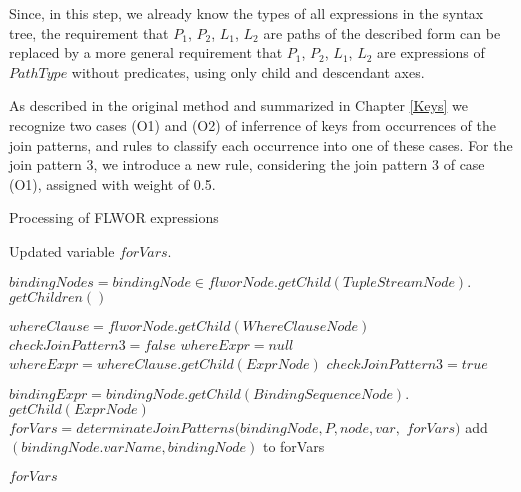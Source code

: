 Since, in this step, we already know the types of all expressions in the syntax tree, the requirement that $P_1$, $P_2$, $L_1$, $L_2$ are paths of the described form can be replaced by a more general requirement that $P_1$, $P_2$, $L_1$, $L_2$ are expressions of $PathType$ without predicates, using only child and descendant axes.

As described in the original method and summarized in Chapter \ref{Keys} we recognize two cases (O1) and (O2) of inferrence of keys from occurrences of the join patterns, and rules to classify each occurrence into one of these cases. For the join pattern 3, we introduce a new rule, considering the join pattern 3 of case (O1), assigned with weight of 0.5. 

\begin{algorithm}
\caption{Processing of FLWOR expressions}
\label{ALG_processing_of_flwor_expressions}
\begin{algorithmic}[1]

\ENSURE Updated variable $forVars$.

\STATE $bindingNodes = bindingNode \in flworNode.getChild(TupleStreamNode).$ $getChildren()$

\STATE $whereClause = flworNode.getChild(WhereClauseNode)$
\STATE $checkJoinPattern3 = false$
\STATE $whereExpr = null$
    \STATE $whereExpr = whereClause.getChild(ExprNode)$
        \STATE $checkJoinPattern3 = true$
    \ENDIF
\ENDIF

    \STATE $bindingExpr = bindingNode.getChild(BindingSequenceNode).$ $getChild(ExprNode)$
            \STATE $forVars = determinateJoinPatterns(bindingNode, P, node, var,$ $forVars)$
        \ENDFOR
            \STATE add $(bindingNode.varName, bindingNode)$ to forVars
        \ENDIF
    \ENDIF
\ENDFOR

\RETURN $forVars$
\end{algorithmic}
\end{algorithm}

